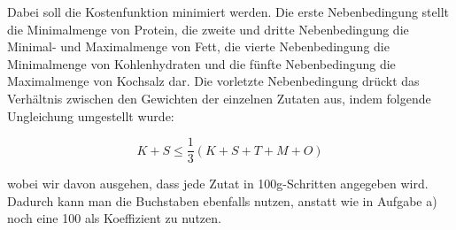\documentclass{article}
\begin{document}
Dabei soll die Kostenfunktion minimiert werden. Die erste Nebenbedingung stellt die Minimalmenge von Protein, die zweite und dritte Nebenbedingung die Minimal- und Maximalmenge von Fett, die vierte Nebenbedingung die Minimalmenge von Kohlenhydraten und die fünfte Nebenbedingung die Maximalmenge von Kochsalz dar. Die vorletzte Nebenbedingung drückt das Verhältnis zwischen den Gewichten der einzelnen Zutaten aus, indem folgende Ungleichung umgestellt wurde:

$$K + S \leq \frac{1}{3}(K + S + T + M + O)$$

wobei wir davon ausgehen, dass jede Zutat in 100g-Schritten angegeben wird. Dadurch kann man die Buchstaben ebenfalls nutzen, anstatt wie in Aufgabe a) noch eine 100 als Koeffizient zu nutzen.
\end{document}
